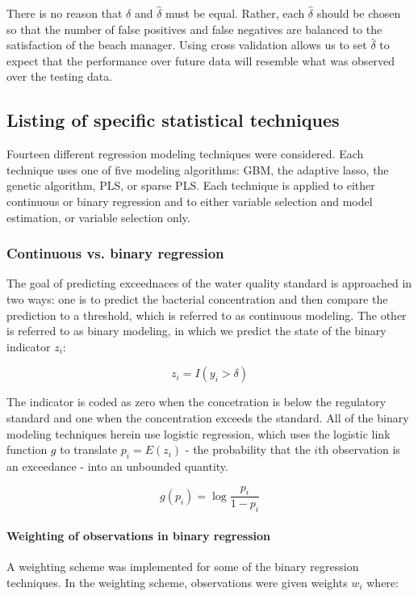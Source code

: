 \documentclass{article}\usepackage[]{graphicx}\usepackage[]{color}
\numberwithin{equation}{section}
\numberwithin{figure}{section}
\renewcommand\[{\begin{equation}}
\renewcommand\]{\end{equation}}
\begin{document}
There is no reason that $\delta$ and $\hat{{\delta}}$ must be equal.
Rather, each $\hat{{\delta}}$ should be chosen so that the number
of false positives and false negatives are balanced to the satisfaction
of the beach manager. Using cross validation allows us to set $\hat{{\delta}}$
to expect that the performance over future data will resemble what
was observed over the testing data.


\subsection{Listing of specific statistical techniques}

Fourteen different regression modeling techniques were considered.
Each technique uses one of five modeling algorithms: GBM, the adaptive
lasso, the genetic algorithm, PLS, or sparse PLS. Each technique is
applied to either continuous or binary regression and to either variable
selection and model estimation, or variable selection only.


\subsubsection*{Continuous vs. binary regression}

The goal of predicting exceednaces of the water quality standard is
approached in two ways: one is to predict the bacterial concentration
and then compare the prediction to a threshold, which is referred
to as continuous modeling. The other is referred to as binary modeling,
in which we predict the state of the binary indicator $z_{i}$:

\[
z_{i}=I(y_{i}>\delta)
\]


The indicator is coded as zero when the concetration is below the
regulatory standard and one when the concentration exceeds the standard.
All of the binary modeling techniques herein use logistic regression,
which uses the logistic link function $g$ to translate $p_{i}=E(z_{i})$
- the probability that the $i$th observation is an exceedance - into
an unbounded quantity.

\[
g(p_{i})=\log\frac{p_{i}}{1-p_{i}}
\]



\paragraph*{Weighting of observations in binary regression}

A weighting scheme was implemented for some of the binary regression
techniques. In the weighting scheme, observations were given weights
$w_{i}$ where:
\end{document}
